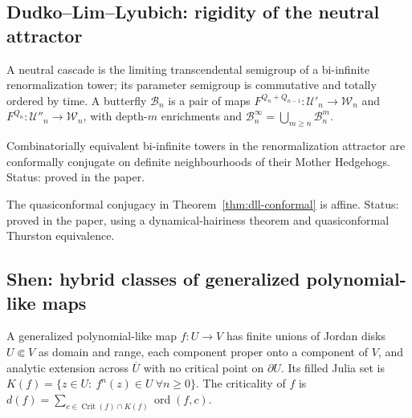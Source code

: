 \subsection*{Dudko--Lim--Lyubich: rigidity of the neutral attractor}

\begin{definition}
\label{def:neutral-cascade}
A neutral cascade is the limiting transcendental semigroup of a bi-infinite
renormalization tower; its parameter semigroup is commutative and totally ordered
by time.  A butterfly $\mathcal B_n$ is a pair of maps $F^{Q_n+Q_{n-1}}\colon\mathcal U'_n\to\mathcal W_n$
and $F^{Q_n}\colon\mathcal U''_n\to\mathcal W_n$, with depth-$m$ enrichments and
$\mathcal B^\infty_n=\bigcup_{m\ge n}\mathcal B^m_n$.
\end{definition}

\begin{theorem}
\label{thm:dll-conformal}
Combinatorially equivalent bi-infinite towers in the renormalization attractor are
conformally conjugate on definite neighbourhoods of their Mother Hedgehogs.  Status:
proved in the paper.
\end{theorem}

\begin{theorem}
\label{thm:dll-affine}
The quasiconformal conjugacy in Theorem~\ref{thm:dll-conformal} is affine.  Status:
proved in the paper, using a dynamical-hairiness theorem and quasiconformal
Thurston equivalence.
\end{theorem}

\subsection*{Shen: hybrid classes of generalized polynomial-like maps}

\begin{definition}
\label{def:shen}
A generalized polynomial-like map $f\colon U\to V$ has finite unions of Jordan disks
$U\Subset V$ as domain and range, each component proper onto a component of $V$, and
analytic extension across $\overline U$ with no critical point on $\partial U$.  Its
filled Julia set is $K(f)=\{z\in U:\ f^n(z)\in U\ \forall n\ge0\}$.  The criticality of $f$ is
$d(f)=\sum_{c\in\operatorname{Crit}(f)\cap K(f)}\operatorname{ord}(f,c)$.
\end{definition}

